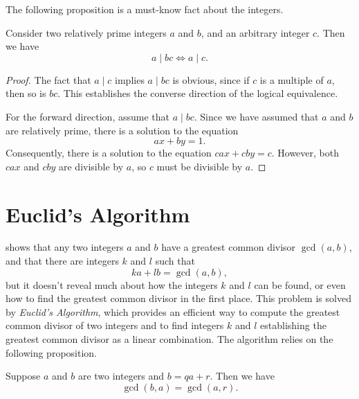 The following proposition is a must-know fact about the integers.

\begin{proposition}\label{proposition:coprime-divides-product}
  Consider two relatively prime integers $a$ and $b$, and an arbitrary integer $c$. Then we have
  \begin{equation*}
    a\mid bc \Leftrightarrow a\mid c.
  \end{equation*}
\end{proposition}

\begin{proof}
  The fact that $a\mid c$ implies $a\mid bc$ is obvious, since if $c$ is a multiple of $a$, then so is $bc$. This establishes the converse direction of the logical equivalence.

  For the forward direction, assume that $a\mid bc$. Since we have assumed that $a$ and $b$ are relatively prime, there is a solution to the equation
  \begin{equation*}
    ax+by=1.
  \end{equation*}
  Consequently, there is a solution to the equation $cax+cby=c$. However, both $cax$ and $cby$ are divisible by $a$, so $c$ must be divisible by $a$.
\end{proof}

\section{Euclid's Algorithm}

 shows that any two integers $a$ and $b$ have a greatest common divisor $\gcd(a,b)$, and that there are integers $k$ and $l$ such that
\begin{equation*}
  ka+lb=\gcd(a,b),
\end{equation*}
but it doesn't reveal much about how the integers $k$ and $l$ can be found, or even how to find the greatest common divisor in the first place. This problem is solved by \emph{Euclid's Algorithm}, which provides an efficient way to compute the greatest common divisor of two integers and to find integers $k$ and $l$ establishing the greatest common divisor as a linear combination. The algorithm relies on the following proposition.

\begin{proposition}\label{proposition:gcd-euclidean-division}
  Suppose $a$ and $b$ are two integers and $b=qa+r$. Then we have
  \begin{equation*}
    \gcd(b,a)=\gcd(a,r).
  \end{equation*}
\end{proposition}


